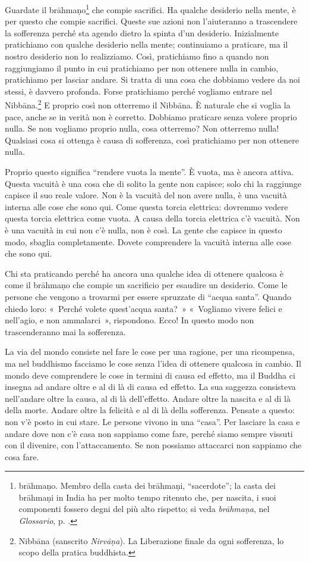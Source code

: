 Guardate il brāhmaṇo\footnote{brāhmaṇo. Membro della casta dei brāhmaṇi,
  ``sacerdote''; la casta dei brāhmaṇi in India ha per molto tempo
  ritenuto che, per nascita, i suoi componenti fossero degni del più
  alto rispetto; si veda \emph{brāhmaṇa}, nel \emph{Glossario}, p. \pageref{glossary-brahmana}.} che
compie sacrifici. Ha qualche desiderio nella mente, è per questo che
compie sacrifici. Queste sue azioni non l'aiuteranno a trascendere la
sofferenza perché sta agendo dietro la spinta d'un desiderio.
Inizialmente pratichiamo con qualche desiderio nella mente; continuiamo
a praticare, ma il nostro desiderio non lo realizziamo. Così,
pratichiamo fino a quando non raggiungiamo il punto in cui pratichiamo
per non ottenere nulla in cambio, pratichiamo per lasciar andare. Si
tratta di una cosa che dobbiamo vedere da noi stessi, è davvero
profonda. Forse pratichiamo perché vogliamo entrare nel
Nibbāna.\footnote{Nibbāna (sanscrito \emph{Nirvāṇa}). La
  Liberazione finale da ogni sofferenza, lo scopo della pratica
  buddhista.} E proprio così non otterremo il Nibbāna. È naturale
che si voglia la pace, anche se in verità non è corretto. Dobbiamo
praticare senza volere proprio nulla. Se non vogliamo proprio nulla,
cosa otterremo? Non otterremo nulla! Qualsiasi cosa si ottenga è causa
di sofferenza, così pratichiamo per non ottenere nulla.

Proprio questo significa ``rendere vuota la mente''. È vuota, ma è
ancora attiva. Questa vacuità è una cosa che di solito la gente non
capisce; solo chi la raggiunge capisce il suo reale valore. Non è la
vacuità del non avere nulla, è una vacuità interna alle cose che sono
qui. Come questa torcia elettrica: dovremmo vedere questa torcia
elettrica come vuota. A causa della torcia elettrica c'è vacuità. Non è
una vacuità in cui non c'è nulla, non è così. La gente che capisce in
questo modo, sbaglia completamente. Dovete comprendere la vacuità
interna alle cose che sono qui.

Chi sta praticando perché ha ancora una qualche idea di ottenere
qualcosa è come il brāhmaṇo che compie un sacrificio per esaudire un
desiderio. Come le persone che vengono a trovarmi per essere spruzzate
di ``acqua santa''. Quando chiedo loro: «~Perché volete quest'acqua
santa?~» «~Vogliamo vivere felici e nell'agio, e non ammalarci~»,
rispondono. Ecco! In questo modo non trascenderanno mai la sofferenza.

La via del mondo consiste nel fare le cose per una ragione, per una
ricompensa, ma nel buddhismo facciamo le cose senza l'idea di ottenere
qualcosa in cambio. Il mondo deve comprendere le cose in termini di
causa ed effetto, ma il Buddha ci insegna ad andare oltre e al di là di
causa ed effetto. La sua saggezza consisteva nell'andare oltre la causa,
al di là dell'effetto. Andare oltre la nascita e al di là della morte.
Andare oltre la felicità e al di là della sofferenza. Pensate a questo:
non v'è posto in cui stare. Le persone vivono in una ``casa''. Per
lasciare la casa e andare dove non c'è casa non sappiamo come fare,
perché siamo sempre vissuti con il divenire, con l'attaccamento. Se non
possiamo attaccarci non sappiamo che cosa fare.


